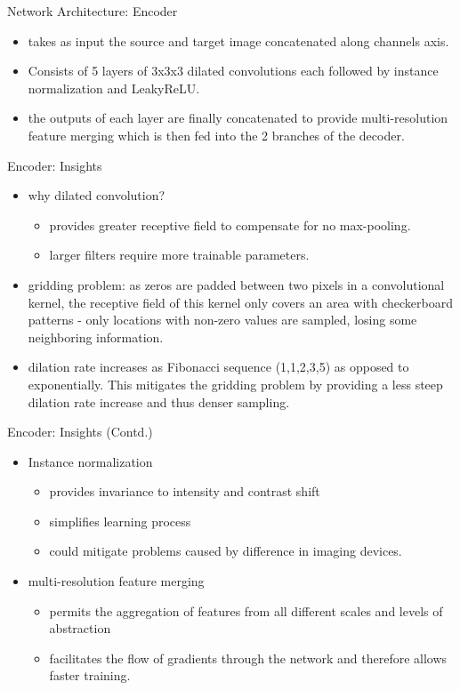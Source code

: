 \documentclass{beamer}
\begin{document}
\begin{frame}{Network Architecture: Encoder}
\begin{itemize}
    \item takes as input the source and target image concatenated along channels axis.
    \item Consists of 5 layers of 3x3x3 dilated convolutions each followed by instance normalization and LeakyReLU.
    \item the outputs of each layer are finally concatenated to provide multi-resolution feature merging which is then fed into the 2 branches of the decoder.
\end{itemize}
\end{frame}

\begin{frame}{Encoder: Insights}
    \begin{itemize}
    \item why dilated convolution?
    \begin{itemize}
        \item provides greater receptive field to compensate for no max-pooling.
        \item larger filters require more trainable parameters.
    \end{itemize}
    \pause
    \item gridding problem: as zeros are padded between two pixels in a convolutional kernel, the receptive field of this kernel only covers an area with checkerboard patterns - only locations with non-zero values are sampled, losing some neighboring information.
    \pause
    \item dilation rate increases as Fibonacci sequence (1,1,2,3,5) as opposed to exponentially. This mitigates the gridding problem by providing a less steep dilation rate increase and thus denser sampling.
\end{itemize}
\end{frame}

\begin{frame}{Encoder: Insights (Contd.)}
    \begin{itemize}
    \item Instance normalization
    \begin{itemize}
        \item provides invariance to intensity and contrast shift
        \item simplifies learning process
        \item could mitigate problems caused by difference in imaging devices.
    \end{itemize}
    \pause
    \item multi-resolution feature merging
    \begin{itemize}
        \item permits the aggregation of features from all different scales and levels of abstraction
        \item facilitates the flow of gradients through the network and therefore allows faster training.
    \end{itemize}
\end{itemize}
\end{frame}
\end{document}
